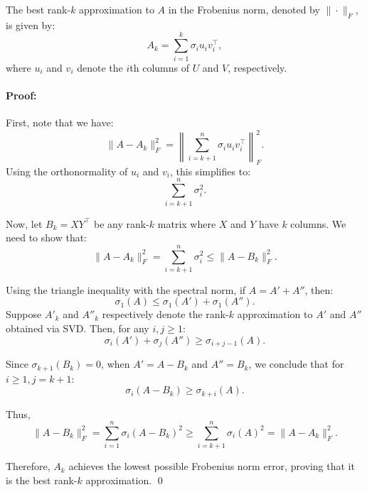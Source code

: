 \documentclass[11pt,twoside,a4paper]{article}
\begin{document}
The best rank-$k$ approximation to $A$ in the Frobenius norm, denoted by $\| \cdot \|_F$, is given by:
\begin{equation}
    A_k = \sum_{i=1}^{k} \sigma_i u_i v_i^{\top},
\end{equation}
where $u_i$ and $v_i$ denote the $i$th columns of $U$ and $V$, respectively.

\paragraph{Proof:}
First, note that we have:
\begin{equation}
    \| A - A_k \|_F^2 = \left\| \sum_{i=k+1}^{n} \sigma_i u_i v_i^{\top} \right\|_F^2.
\end{equation}
Using the orthonormality of $u_i$ and $v_i$, this simplifies to:
\begin{equation}
    \sum_{i=k+1}^{n} \sigma_i^2.
\end{equation}

Now, let $B_k = XY^{\top}$ be any rank-$k$ matrix where $X$ and $Y$ have $k$ columns. We need to show that:
\begin{equation}
    \| A - A_k \|_F^2 = \sum_{i=k+1}^{n} \sigma_i^2 \leq \| A - B_k \|_F^2.
\end{equation}

Using the triangle inequality with the spectral norm, if $A = A' + A''$, then:
\begin{equation}
    \sigma_1(A) \leq \sigma_1(A') + \sigma_1(A'').
\end{equation}
Suppose $A'_k$ and $A''_k$ respectively denote the rank-$k$ approximation to $A'$ and $A''$ obtained via SVD. Then, for any $i,j \geq 1$:
\begin{equation}
    \sigma_i(A') + \sigma_j(A'') \geq \sigma_{i+j-1}(A).
\end{equation}

Since $\sigma_{k+1}(B_k) = 0$, when $A' = A - B_k$ and $A'' = B_k$, we conclude that for $i \geq 1, j = k+1$:
\begin{equation}
    \sigma_i(A - B_k) \geq \sigma_{k+i}(A).
\end{equation}

Thus,
\begin{equation}
    \| A - B_k \|_F^2 = \sum_{i=1}^{n} \sigma_i(A - B_k)^2 \geq \sum_{i=k+1}^{n} \sigma_i(A)^2 = \| A - A_k \|_F^2.
\end{equation}

Therefore, $A_k$ achieves the lowest possible Frobenius norm error, proving that it is the best rank-$k$ approximation. \qed
\end{document}
